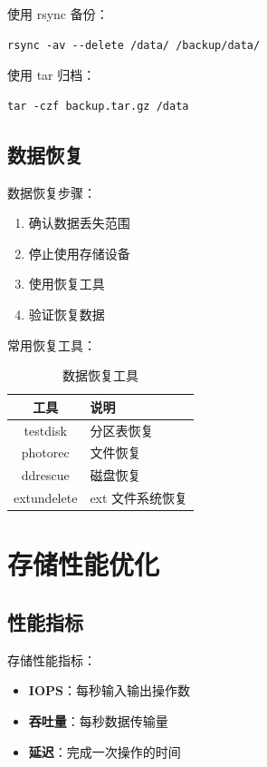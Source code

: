 \documentclass[12pt,UTF8]{ctexbook}
\begin{document}
使用 rsync 备份：
\begin{verbatim}
rsync -av --delete /data/ /backup/data/
\end{verbatim}

使用 tar 归档：
\begin{verbatim}
tar -czf backup.tar.gz /data
\end{verbatim}

\section{数据恢复}
\label{sec:data_recovery}

数据恢复步骤：
\begin{enumerate}
    \item 确认数据丢失范围
    \item 停止使用存储设备
    \item 使用恢复工具
    \item 验证恢复数据
\end{enumerate}

常用恢复工具：
\begin{table}[htbp]
    \centering
    \caption{数据恢复工具}
    \begin{tabular}{|c|p{8cm}|}
        \hline
        \textbf{工具} & \textbf{说明} \\
        \hline
        testdisk & 分区表恢复 \\
        \hline
        photorec & 文件恢复 \\
        \hline
        ddrescue & 磁盘恢复 \\
        \hline
        extundelete & ext 文件系统恢复 \\
        \hline
    \end{tabular}
\end{table}

\chapter{存储性能优化}
\label{chap:performance}

\section{性能指标}
\label{sec:performance_metrics}

存储性能指标：
\begin{itemize}
    \item \textbf{IOPS}：每秒输入输出操作数
    \item \textbf{吞吐量}：每秒数据传输量
    \item \textbf{延迟}：完成一次操作的时间
\end{itemize}
\end{document}
